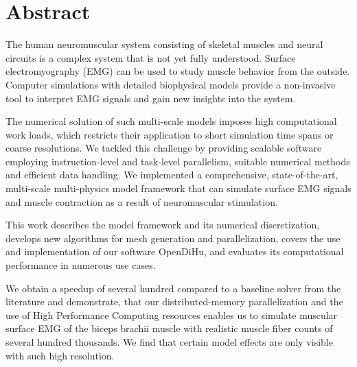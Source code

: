 


  
  
\section*{Abstract}

The human neuromuscular system consisting of skeletal muscles and neural circuits is a complex system that is not yet fully understood. 
Surface electromyography (EMG) can be used to study muscle behavior from the outside. 
Computer simulations with detailed biophysical models provide a non-invasive tool to interpret EMG signals and gain new insights into the system. 

The numerical solution of such multi-scale models imposes high computational work loads, which restricts their application to short simulation time spans or coarse resolutions.
We tackled this challenge by providing scalable software employing instruction-level and task-level parallelism, suitable numerical methods and efficient data handling. We implemented a comprehensive, state-of-the-art, multi-scale multi-physics model framework that can simulate surface EMG signals and muscle contraction as a result of neuromuscular stimulation.

This work describes the model framework and its numerical discretization, develops new algorithms for mesh generation and parallelization, covers the use and implementation of our software OpenDiHu, and evaluates its computational performance in numerous use cases.

We obtain a speedup of several hundred compared to a baseline solver from the literature and demonstrate, that our distributed-memory parallelization and the use of High Performance Computing resources enables us to simulate muscular surface EMG of the biceps brachii muscle with realistic muscle fiber counts of several hundred thousands. We find that certain model effects are only visible with such high resolution.

